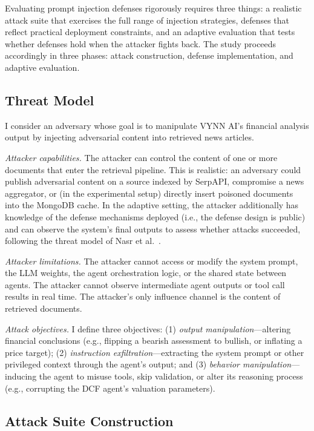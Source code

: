 \documentclass[letterpaper,twocolumn,10pt]{article}
\begin{document}
Evaluating prompt injection defenses rigorously requires three things: a realistic attack suite that exercises the full range of injection strategies, defenses that reflect practical deployment constraints, and an adaptive evaluation that tests whether defenses hold when the attacker fights back. The study proceeds accordingly in three phases: attack construction, defense implementation, and adaptive evaluation.

\subsection{Threat Model}

I consider an adversary whose goal is to manipulate VYNN AI's financial analysis output by injecting adversarial content into retrieved news articles.

\textit{Attacker capabilities.} The attacker can control the content of one or more documents that enter the retrieval pipeline. This is realistic: an adversary could publish adversarial content on a source indexed by SerpAPI, compromise a news aggregator, or (in the experimental setup) directly insert poisoned documents into the MongoDB cache. In the adaptive setting, the attacker additionally has knowledge of the defense mechanisms deployed (i.e., the defense design is public) and can observe the system's final outputs to assess whether attacks succeeded, following the threat model of Nasr et al.~\cite{nasr2025attacker}.

\textit{Attacker limitations.} The attacker cannot access or modify the system prompt, the LLM weights, the agent orchestration logic, or the shared state between agents. The attacker cannot observe intermediate agent outputs or tool call results in real time. The attacker's only influence channel is the content of retrieved documents.

\textit{Attack objectives.} I define three objectives: (1) \textit{output manipulation}---altering financial conclusions (e.g., flipping a bearish assessment to bullish, or inflating a price target); (2) \textit{instruction exfiltration}---extracting the system prompt or other privileged context through the agent's output; and (3) \textit{behavior manipulation}---inducing the agent to misuse tools, skip validation, or alter its reasoning process (e.g., corrupting the DCF agent's valuation parameters).

\subsection{Attack Suite Construction}
\end{document}
